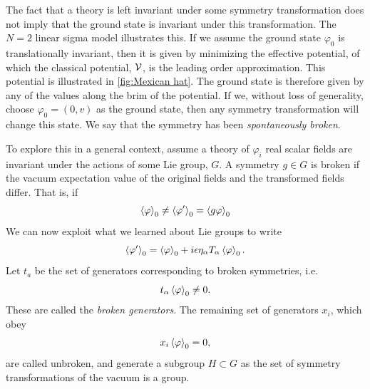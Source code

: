 The fact that a theory is left invariant under some symmetry transformation does not imply that the ground state is invariant under this transformation.
The $N = 2$ linear sigma model illustrates this.
If we assume the ground state $\varphi_{0}$ is translationally invariant, then it is given by minimizing the effective potential, of which the classical potential, $\mathcal{V}$, is the leading order approximation.
This potential is illustrated in \autoref{fig:Mexican hat}.
The ground state is therefore given by any of the values along the brim of the potential.
If we, without loss of generality, choose $\varphi_0 = (0, v)$ as the ground state, then any symmetry transformation will change this state.
We say that the symmetry has been \emph{spontaneously broken}.

To explore this in a general context, assume a theory of $\varphi_i$ real scalar fields are invariant under the actions of some Lie group, $G$.
A symmetry $g \in G$ is broken if the vacuum expectation value of the original fields and the transformed fields differ.
That is, if
\begin{equation}
    \ex{\varphi}_0 \neq \ex{\varphi'}_0 = \ex{g \varphi}_0
\end{equation}
We can now exploit what we learned about Lie groups to write
\begin{equation}
    \ex{\varphi'}_0 = \ex{\varphi}_0 + i \epsilon \eta_\alpha T_\alpha \ex{\varphi}_0.
\end{equation}
Let $t_a$ be the set of generators corresponding to broken symmetries, i.e.
\begin{equation}
    t_\alpha \ex{\varphi}_0 \neq 0.
\end{equation}
These are called the \emph{broken generators}.
The remaining set of generators $x_i$, which obey
\begin{equation}
    x_i \ex{\varphi}_0 = 0,
\end{equation}
are called unbroken, and generate a subgroup $H \subset G$ as the set of symmetry transformations of the vacuum is a group.

